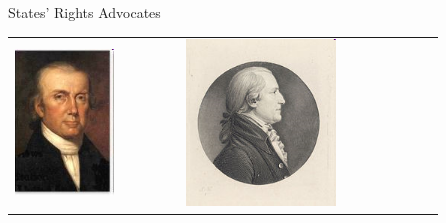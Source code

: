 \begin{frame}{States' Rights Advocates}
\begin{table}[h]
\begin{tabular}{lcccccc}
    \includegraphics[width=0.75\textwidth,height=.3\textheight,keepaspectratio=true]{img/john-taylor-of-caroline.png} &
    \includegraphics[width=0.75\textwidth,height=.3\textheight,keepaspectratio=true]{img/st-george-tucker.png} &

\end{tabular}
\end{table}
\end{frame}
